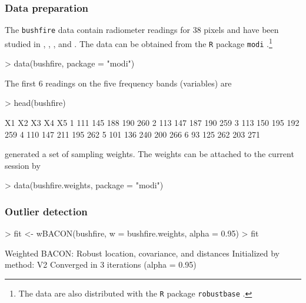 \documentclass[a4paper,oneside,11pt,DIV=12]{scrartcl}
\newcommand{\code}[1]{{\texttt{#1}}}
\begin{document}
\subsubsection*{Data preparation}
The \code{bushfire} data contain radiometer readings for 38 pixels and have been studied in \citet{maronna_yohai_1995}, \citet{beguin_hulliger_2002}, \cite{beguin_hulliger_2008}, and \cite{hulliger_schoch_2009a}. The data can be obtained from the \code{R} package \code{modi} \citep{hulliger_sterchi_2020}.\footnote{The data are also distributed with the \code{R} package \code{robustbase} \citep{machler_rousseeuw_etal_2020}.} 
\begin{Schunk}
\begin{Sinput}
> data(bushfire, package = "modi")
\end{Sinput}
\end{Schunk}
\noindent The first 6 readings on the five frequency bands (variables) are
\begin{Schunk}
\begin{Sinput}
> head(bushfire)
\end{Sinput}
\begin{Soutput}
   X1  X2  X3  X4  X5
1 111 145 188 190 260
2 113 147 187 190 259
3 113 150 195 192 259
4 110 147 211 195 262
5 101 136 240 200 266
6  93 125 262 203 271
\end{Soutput}
\end{Schunk}
\noindent \citet{beguin_hulliger_2008} generated a set of sampling weights. The weights can be attached to the current session by
\begin{Schunk}
\begin{Sinput}
> data(bushfire.weights, package = "modi")
\end{Sinput}
\end{Schunk}

\subsubsection*{Outlier detection}

\begin{Schunk}
\begin{Sinput}
> fit <- wBACON(bushfire, w = bushfire.weights, alpha = 0.95)
> fit
\end{Sinput}
\begin{Soutput}
Weighted BACON: Robust location, covariance, and distances
Initialized by method: V2 
Converged in 3 iterations (alpha = 0.95)
\end{Soutput}
\end{Schunk}
\end{document}
